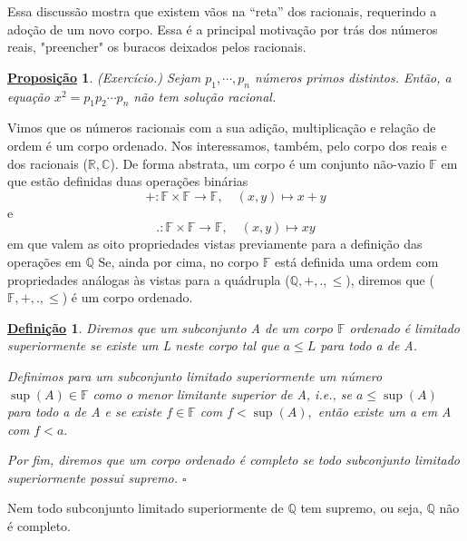 \documentclass{article}
\newtheorem*{def*}{\underline{Defini\c c\~ao}}
\newtheorem*{prop*}{\underline{Proposi\c c\~ao}}
\begin{document}
  Essa discuss\~ao mostra que existem v\~aos na ``reta'' dos racionais, requerindo a ado\c c\~ao de um novo corpo. Essa \'e a principal
motiva\c c\~ao por tr\'as dos n\'umeros reais, "preencher" os buracos deixados pelos racionais.
\begin{prop*}
  (Exerc\'icio.) Sejam $p_{1}, \cdots, p_{n}$ n\'umeros primos distintos. Ent\~ao, a equa\c c\~ao $x^{2} = p_{1}p_2\cdots p_{n}$ n\~ao
tem solu\c c\~ao racional.
\end{prop*}
  Vimos que os n\'umeros racionais com a sua adi\c c\~ao, multiplica\c c\~ao e rela\c c\~ao de ordem \'e um corpo ordenado. Nos interessamos,
tamb\'em, pelo corpo dos reais e dos racionais ($\mathbb{R}, \mathbb{C}$). De forma abstrata, um corpo \'e um conjunto n\~ao-vazio
 $\mathbb{F}$ em que est\~ao definidas duas opera\c c\~oes bin\'arias
 $$
    +:\mathbb{F}\times \mathbb{F}\rightarrow \mathbb{F}, \quad (x, y)\mapsto x + y
 $$
 e 
 $$
    .: \mathbb{F}\times \mathbb{F}\rightarrow \mathbb{F}, \quad (x, y)\mapsto xy
 $$
 em que valem as oito propriedades vistas previamente para a defini\c c\~ao das opera\c c\~oes em $\mathbb{Q}$
 Se, ainda por cima, no corpo $\mathbb{F}$ est\'a definida uma ordem com propriedades an\'alogas \`as vistas para a qu\'adrupla
($\mathbb{Q}, +, ., \leq{}$), diremos que ($\mathbb{F}, +, ., \leq{}$) \'e um corpo ordenado.
\begin{def*}
  Diremos que um subconjunto A de um corpo $\mathbb{F}$ ordenado \'e limitado superiormente se existe um L neste corpo tal que $a \leq{L}$ para todo
a de A. 

  Definimos para um subconjunto limitado superiormente um n\'umero $\sup(A)\in \mathbb{F}$ como o menor limitante superior de
A, i.e., se $a \leq{\sup(A)}$ para todo a de A e se existe $f\in \mathbb{F}$ com $f < \sup(A),$ ent\~ao existe um a em A com $ f < a.$

  Por fim, diremos que um corpo ordenado \'e completo se todo subconjunto limitado superiormente possui supremo. $\square$
\end{def*}
  Nem todo subconjunto limitado superiormente de $\mathbb{Q}$ tem supremo, ou seja, $\mathbb{Q}$ n\~ao \'e completo.
\end{document}
